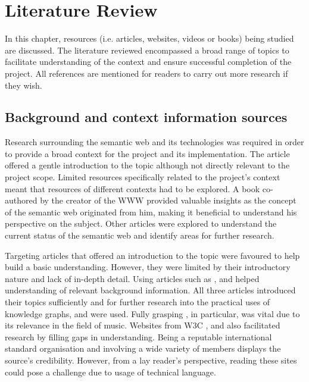\chapter{Literature Review}
In this chapter, resources (i.e. articles, websites, videos or books) being studied are discussed. The literature reviewed encompassed a broad range of topics to facilitate understanding of the context and ensure successful completion of the project. All references are mentioned for readers to carry out more research if they wish. 

\section{Background and context information sources}
\hspace{0.5cm} Research surrounding the semantic web and its technologies was required in order to provide a broad context for the project and its implementation. The article \cite{semanticweb} offered a gentle introduction to the topic although not directly relevant to the project scope. Limited resources specifically related to the project's context meant that resources of different contexts had to be explored. A book \cite{berners-TBLBook} co-authored by the creator of the WWW provided valuable insights as the concept of the semantic web originated from him, making it beneficial to understand his perspective on the subject. Other articles \cite{bizer2011linked} were explored to understand the current status of the semantic web and identify areas for further research. 

Targeting articles that offered an introduction to the topic were favoured to help build a basic understanding. However, they were limited by their introductory nature and lack of in-depth detail. Using articles such as \cite{ontology}, \cite{knowledgegraph} and \cite{rdf} helped understanding of relevant background information. All three articles introduced their topics sufficiently and for further research into the practical uses of knowledge graphs, \cite{searchengine} and \cite{oramas2016sound} were used. Fully grasping \cite{oramas2016sound}, in particular, was vital due to its relevance in the field of music. Websites from W3C \cite{TTL}, \cite{w3crdf} and \cite{w3cvocabularies} also facilitated research by filling gaps in understanding. Being a reputable international standard organisation and involving a wide variety of members displays the source's credibility. However, from a lay reader's perspective, reading these sites could pose a challenge due to usage of technical language. 

